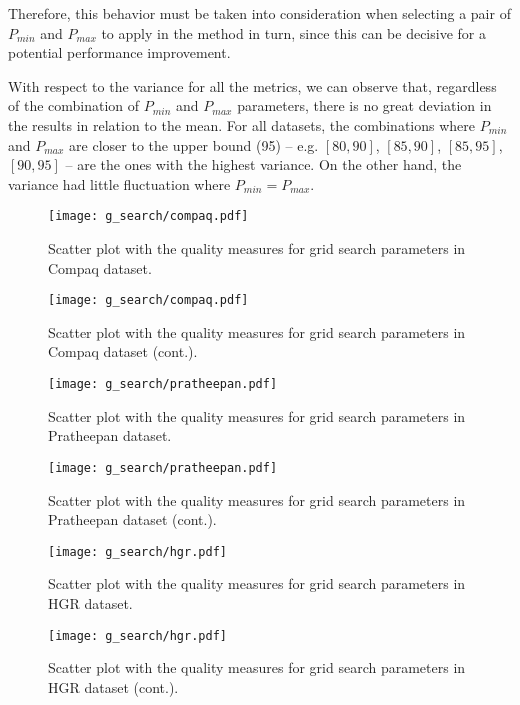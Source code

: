 Therefore, this behavior must be taken into consideration when selecting a pair of $P_{min}$ and $P_{max}$ to apply in the method in turn, since this can be decisive for a potential performance improvement.

With respect to the variance for all the metrics, we can observe that, regardless of the combination of $P_{min}$ and $P_{max}$ parameters, there is no great deviation in the results in relation to the mean. For all datasets, the combinations where $P_{min}$ and $P_{max}$ are closer to the upper bound (95) -- e.g. $[80, 90]$, $[85, 90]$, $[85, 95]$, $[90 ,95]$ -- are the ones with the highest variance. On the other hand, the variance had little fluctuation where $P_{min} = P_{max}$.

\clearpage %

\begin{figure}[!htb]
    \centering
    \texttt{[image: g\_search/compaq.pdf]}

    \caption{Scatter plot with the quality measures for grid search parameters in Compaq dataset.}
\end{figure}
\begin{figure}[!htb]
    \ContinuedFloat
    \centering
    \texttt{[image: g\_search/compaq.pdf]}

    \caption{Scatter plot with the quality measures for grid search parameters in Compaq dataset (cont.).}
    \label{fig:compaq_g_search}
\end{figure}


\begin{figure}[!htb]
    \centering
    \texttt{[image: g\_search/pratheepan.pdf]}

    \caption{Scatter plot with the quality measures for grid search parameters in Pratheepan dataset.}
\end{figure}
\begin{figure}[!htb]
    \ContinuedFloat
    \centering
    \texttt{[image: g\_search/pratheepan.pdf]}

    \caption{Scatter plot with the quality measures for grid search parameters in Pratheepan dataset (cont.).}
    \label{fig:pratheepan_g_search}
\end{figure}


\begin{figure}[!htb]
    \centering
    \texttt{[image: g\_search/hgr.pdf]}

    \caption{Scatter plot with the quality measures for grid search parameters in HGR dataset.}
\end{figure}
\begin{figure}[!htb]
    \ContinuedFloat
    \centering
    \texttt{[image: g\_search/hgr.pdf]}

    \caption{Scatter plot with the quality measures for grid search parameters in HGR dataset (cont.).}
    \label{fig:hgr_g_search}
\end{figure}


